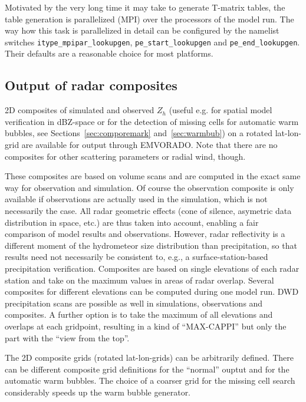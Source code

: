 \documentclass[10pt,a4paper,twoside,headinclude,footinclude,parskip=half]{scrartcl}
\newcommand{\myaktuellesection}{sec:intro}%
\newcommand{\labelsec}[1]{\label{#1}\renewcommand{\myaktuellesection}{#1}}%
\newcommand{\labelsec}[1]{\label{#1}}%
\newcommand{\srcform}[1]{\mbox{\texttt{#1}}\xspace}%
\begin{document}
Motivated by the very long time it may take to generate T-matrix tables, the table generation is parallelized (MPI) over the processors of the model run.
The way how this task is parallelized in detail can be configured by the namelist switches \srcform{itype_mpipar_lookupgen}, \srcform{pe_start_lookupgen} and \srcform{pe_end_lookupgen}.
Their defaults are a reasonable choice for most platforms.


\subsection{Output of radar composites}

\labelsec{sec:intro:compo}

2D composites of simulated and observed $Z_h$ (useful e.g. for spatial model verification in dBZ-space or for the detection of missing cells for automatic warm bubbles, see Sections~\ref{sec:comporemark} and~\ref{sec:warmbub}) on a rotated lat-lon-grid
are available for output through EMVORADO. Note that there are no composites for other scattering parameters or radial wind, though.

These composites are based on volume scans and are computed
in the exact same way for observation and simulation. Of course the observation composite is only
available if observations are actually used in the simulation, which is not necessarily the case.
All radar geometric effects (cone of silence,
asymetric data distribution in space, etc.) are thus taken into account, enabling a fair
comparison of model results and observations. However, radar reflectivity is a different moment
of the hydrometeor size distribution than precipitation, so that results need not necessarily be
consistent to, e.g., a surface-station-based precipitation verification.
Composites are based on single elevations of each
radar station and take on the maximum values in areas of radar overlap. Several composites for
different elevations can be computed during one model run. DWD precipitation scans are
possible as well in simulations, observations and composites. A further option is to take the
maximum of all elevations and overlaps at each gridpoint, resulting in a kind of ``MAX-CAPPI'' but only
the part with the ``view from the top''.

The 2D composite grids (rotated lat-lon-grids) can be arbitrarily defined. There can be different composite grid definitions for the ``normal'' ouptut
and for the automatic warm bubbles. The choice of a coarser grid for the missing cell search considerably speeds up the warm bubble generator.
\end{document}
